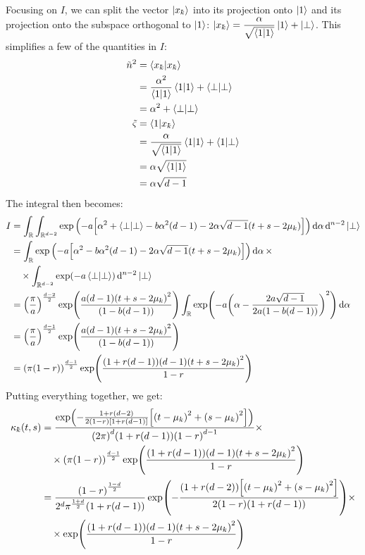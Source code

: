 \documentclass[12pt]{article}
\newcommand{\kbar}{\mathchar'26\mkern-9mu k}
\numberwithin{theorem}{section}
\numberwithin{equation}{section}
\numberwithin{figure}{section}
\begin{document}
Focusing on \(I\), we can split the vector \(\ket{x_{\kbar}}\) into its
projection onto \(\ket{1}\) and its projection onto the subspace orthogonal to
\(\ket{1}\): \(\displaystyle \ket{x_{\kbar}} = \frac{\alpha}{\sqrt{\bra{1}\ket{1}}}
\ket{1} + \ket{\perp}\). This simplifies a
few of the quantities in \(I\):
\begin{align*}
    \tilde{n}^2 &= \bra{x_{\kbar}}\ket{x_{\kbar}} \\
                &= \frac{\alpha^2}{\bra{1}\ket{1}} \bra{1}\ket{1} + \bra{\perp}\ket{\perp} \\
                &= \alpha^2 + \bra{\perp}\ket{\perp} \\
    \tilde{\varsigma} &= \bra{1}\ket{x_{\kbar}} \\
                      &= \frac{\alpha}{\sqrt{\bra{1}\ket{1}}} \bra{1}\ket{1} + \bra{1}\ket{\perp} \\
                      &= \alpha\sqrt{\bra{1}\ket{1}} \\
                      &= \alpha\sqrt{d-1}
\end{align*}
The integral then becomes:
\begin{align*}
    I &= \int_{\mathbb{R}}\int_{\mathbb{R}^{d-2}} \exp\qty(-a\qty[\alpha^2 + \bra{\perp}\ket{\perp} - b\alpha^2\qty(d-1) - 2\alpha\sqrt{d-1}\qty(t + s - 2\mu_k)]) \dd{\alpha}\dd[n-2]{\ket{\perp}} \\
        &= \int_{\mathbb{R}} \exp\qty(-a\qty[\alpha^2 - b\alpha^2\qty(d-1) - 2\alpha\sqrt{d-1}\qty(t + s - 2\mu_k)]) \dd{\alpha} \times \\
        &\quad \times \int_{\mathbb{R}^{d-2}} \exp(-a\bra{\perp}\ket{\perp}) \dd[n-2]{\ket{\perp}} \\
        &= \qty(\frac{\pi}{a})^{\frac{d-2}{2}} \exp(\frac{a\qty(d-1)\qty(t + s - 2\mu_k)^2}{\qty(1 - b\qty(d-1))})\int_{\mathbb{R}} \exp(-a\qty(\alpha - \frac{2a\sqrt{d-1}}{2a\qty(1 - b\qty(d-1))})^2) \dd{\alpha} \\
        &= \qty(\frac{\pi}{a})^{\frac{d-1}{2}} \exp(\frac{a\qty(d-1)\qty(t + s - 2\mu_k)^2}{\qty(1 - b\qty(d-1))}) \\
        &= \qty(\pi\qty(1-r))^{\frac{d-1}{2}} \exp(\frac{\qty(1 + r\qty(d-1))\qty(d-1)\qty(t + s - 2\mu_k)^2}{1-r})
\end{align*}
Putting everything together, we get:
\begin{align*}
    \kappa_{\kbar}\qty(t, s) &= \frac{\exp(-\frac{1 + r\qty(d - 2)}{2\qty(1-r)\qty[1 + r\qty(d-1)]}\qty[\qty(t - \mu_k)^2 + \qty(s - \mu_k)^2])}{\qty(2\pi)^{d}\qty(1 + r\qty(d-1))\qty(1-r)^{d-1}} \times \\
                             &\quad \times \qty(\pi\qty(1-r))^{\frac{d-1}{2}} \exp(\frac{\qty(1 + r\qty(d-1))\qty(d-1)\qty(t + s - 2\mu_k)^2}{1-r}) \\
                             &= \frac{\qty(1-r)^{\frac{1-d}{2}}}{2^{d} \pi^{\frac{1+d}{2}}\qty(1 + r\qty(d-1))} \exp(-\frac{\qty(1 + r\qty(d - 2))\qty[\qty(t - \mu_k)^2 + \qty(s - \mu_k)^2]}{2\qty(1-r)\qty(1 + r\qty(d-1))}) \times \\
                             &\quad \times \exp(\frac{\qty(1 + r\qty(d-1))\qty(d-1)\qty(t + s - 2\mu_k)^2}{1-r})
\end{align*}
\end{document}
